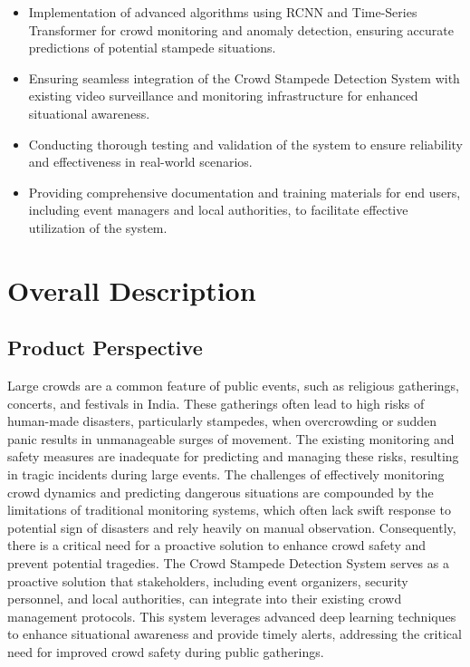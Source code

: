 \documentclass[11pt]{report}
\begin{document}
\begin{itemize}
    \item Implementation of advanced algorithms using RCNN and Time-Series Transformer for crowd monitoring and anomaly detection, ensuring accurate predictions of potential stampede situations.
    
    \item Ensuring seamless integration of the Crowd Stampede Detection System with existing video surveillance and monitoring infrastructure for enhanced situational awareness.
    
    \item Conducting thorough testing and validation of the system to ensure reliability and effectiveness in real-world scenarios.
    
    \item Providing comprehensive documentation and training materials for end users, including event managers and local authorities, to facilitate effective utilization of the system.
\end{itemize}

 
\section{Overall Description}
\subsection{Product Perspective}

    Large crowds are a common feature of public events, such as religious gatherings, concerts, and festivals in India. These gatherings often lead to high risks of human-made disasters, particularly stampedes, when overcrowding or sudden panic results in unmanageable surges of movement. The existing monitoring and safety measures are inadequate for predicting and managing these risks, resulting in tragic incidents during large events. 
    \newline
    The challenges of effectively monitoring crowd dynamics and predicting dangerous situations are compounded by the limitations of traditional monitoring systems, which often lack swift response to potential sign of disasters and rely heavily on manual observation. Consequently, there is a critical need for a proactive solution to enhance crowd safety and prevent potential tragedies. The Crowd Stampede Detection System serves as a proactive solution that stakeholders, including event organizers, security personnel, and local authorities, can integrate into their existing crowd management protocols. This system leverages advanced deep learning techniques to enhance situational awareness and provide timely alerts, addressing the critical need for improved crowd safety during public gatherings.
\end{document}
